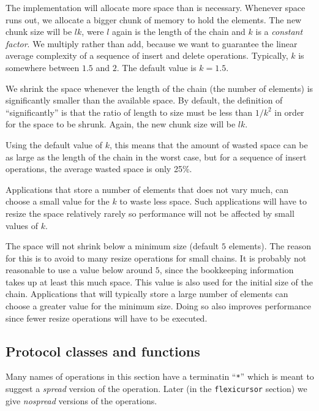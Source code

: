 \documentclass[11pt]{article}
\begin{document}
The implementation will allocate more space than is necessary.
Whenever space runs out, we allocate a bigger chunk of memory to hold
the elements.  The new chunk size will be $lk$, were $l$ again is the
length of the chain and $k$ is a \textit{constant factor}.  We
multiply rather than add, because we want to guarantee the linear
average complexity of a sequence of insert and delete
operations. Typically, $k$ is somewhere between $1.5$ and $2$.  The
default value is $k=1.5$.  

We shrink the space whenever the length of the chain (the number of
elements) is significantly smaller than the available space.  By
default, the definition of ``significantly'' is that the ratio of
length to size must be less than $1/k^2$ in order for the space to be
shrunk.  Again, the new chunk size will be $lk$. 

Using the default value of $k$, this means that the amount of wasted
space can be as large as the length of the chain in the worst case,
but for a sequence of insert operations, the average wasted space is
only 25\%.

Applications that store a number of elements that does not vary much,
can choose a small value for the $k$ to waste less space.  Such
applications will have to resize the space relatively rarely so
performance will not be affected by small values of $k$. 

The space will not shrink below a minimum size (default $5$
elements).  The reason for this is to avoid to many resize operations
for small chains.  It is probably not reasonable to use a value below
around $5$, since the bookkeeping information takes up at least this
much space.  This value is also used for the initial size of the
chain.  Applications that will typically store a large number of
elements can choose a greater value for the minimum size.  Doing so
also improves performance since fewer resize operations will have to
be executed. 

\subsection{Protocol classes and functions}

Many names of operations in this section have a terminatin
``\texttt{*}'' which is meant to suggest a \emph{spread} version of
the operation.  Later (in the \texttt{flexicursor} section) we give
\emph{nospread} versions of the operations.


\end{document}
